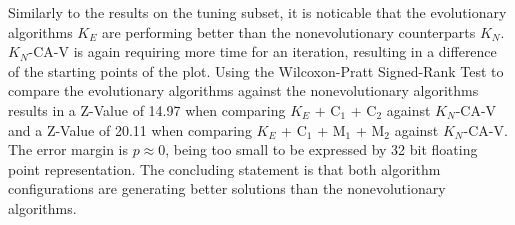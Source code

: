 \documentclass[a4paper,12pt,titlepage, BCOR7mm,headsepline]{scrbook}
\numberwithin{equation}{section}
\begin{document}
Similarly to the results on the tuning subset, it is noticable that the evolutionary algorithms $K_E$ are performing better than the nonevolutionary counterparts $K_N$. $K_N$-CA-V is again requiring more time for an iteration, resulting in a difference of the starting points of the plot. Using the Wilcoxon-Pratt Signed-Rank Test to compare the evolutionary algorithms against the nonevolutionary algorithms results in a Z-Value of 14.97 when comparing $K_E$ + C$_1$ + C$_2$ against $K_N$-CA-V and a Z-Value of 20.11 when comparing $K_E$ + C$_1$ + M$_1$ + M$_2$ against $K_N$-CA-V. The error margin is $p \approx 0$, being too small to be expressed by 32 bit floating point representation.  
The concluding statement is that both algorithm configurations are generating better solutions than the nonevolutionary algorithms. 
\end{document}
